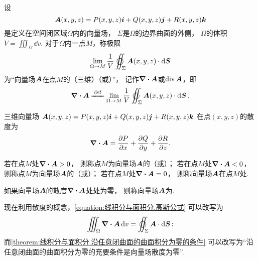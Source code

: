 \begin{definition}[空间中的散度]
\def\defofdiv{\lim_{\Omega \to M} \frac{1}{V} \varoiint_\Sigma \vb{A}(x,y,z) \cdot \dd{\vb{S}}}%
设\[
\boldsymbol{A}(x,y,z)=P(x,y,z)\boldsymbol{i}+Q(x,y,z)\boldsymbol{j}+R(x,y,z)\boldsymbol{k}
\]是定义在空间闭区域\(\Omega\)内的向量场，
\(\Sigma\)是\(\Omega\)的边界曲面的外侧，
\(\Omega\)的体积\(V = \iiint_\Omega \dd{v}\).
对于\(\Omega\)内一点\(M\)，称极限\[
	\defofdiv
\]为“向量场\(\boldsymbol{A}\)在点\(M\)的（三维）（或）”，
记作\(\div{\boldsymbol{A}}\)或\(\operatorname{div}\boldsymbol{A}\)，即\[
	\div{\vb{A}} \defeq \defofdiv.
\]
\end{definition}

\begin{proposition}
三维向量场
\(\boldsymbol{A}(x,y,z)=P(x,y,z)\boldsymbol{i}+Q(x,y,z)\boldsymbol{j}+R(x,y,z)\boldsymbol{k}\)
在点\((x,y,z)\)的散度为\[
	\div{\boldsymbol{A}} = \pdv{P}{x}+\pdv{Q}{y}+\pdv{R}{z}.
\]
\end{proposition}

\begin{definition}
若在点\(M\)处\(\div{\boldsymbol{A}}>0\)，
则称点\(M\)为向量场\(\boldsymbol{A}\)的（或）；
若在点\(M\)处\(\div{\boldsymbol{A}}<0\)，
则称点\(M\)为向量场\(\boldsymbol{A}\)的（或）；
若在点\(M\)处\(\div{\boldsymbol{A}}=0\)，
则称向量场\(\boldsymbol{A}\)在点\(M\)处.

如果向量场\(\boldsymbol{A}\)的散度\(\div{\boldsymbol{A}}\)处处为零，
则称向量场\(\boldsymbol{A}\)为.
\end{definition}

现在利用散度的概念，\cref{equation:线积分与面积分.高斯公式} 可以改写为
\begin{equation}\label{equation:线积分与面积分.高斯公式1}
	\iiint_\Omega \div{\vb{A}} \dd{v} = \varoiint_\Sigma \vb{A} \cdot \dd{\vb{S}};
\end{equation}
而\cref{theorem:线积分与面积分.沿任意闭曲面的曲面积分为零的条件}
可以改写为“沿任意闭曲面的曲面积分为零的充要条件是向量场散度为零”.

